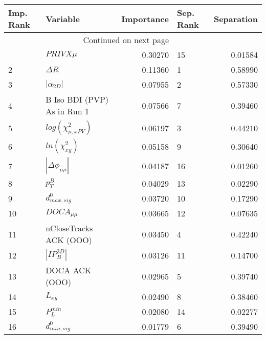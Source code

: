 \usepackage{lscape}

\begin{landscape}
\begin{longtable}{llrlr}
\toprule
Imp. Rank &                     Variable &  Importance & Sep. Rank &  Separation \\
\midrule
\endhead
\midrule
\multicolumn{3}{r}{{Continued on next page}} \\
\midrule
\endfoot

\bottomrule
\endlastfoot
        1 &                   $PRIVX\mu$ &     0.30270 &        15 &     0.01584 \\
        2 &                   $\Delta R$ &     0.11360 &         1 &     0.58990 \\
        3 &              $|\alpha_{2D}|$ &     0.07955 &         2 &     0.57330 \\
        4 &  B Iso BDI (PVP) As in Run 1 &     0.07566 &         7 &     0.39460 \\
        5 &    $log(\chi^{2}_{\mu,xPV})$ &     0.06197 &         3 &     0.44210 \\
        6 &          $ln(\chi^{2}_{xy})$ &     0.05158 &         9 &     0.30640 \\
        7 &     $|\Delta \phi_{\mu\mu}|$ &     0.04187 &        16 &     0.01260 \\
        8 &                    $p^B_{T}$ &     0.04029 &        13 &     0.02290 \\
        9 &             $d^0_{max, sig}$ &     0.03720 &        10 &     0.17290 \\
       10 &              $DOCA_{\mu\mu}$ &     0.03665 &        12 &     0.07635 \\
       11 &       nCloseTracks ACK (OOO) &     0.03450 &         4 &     0.42240 \\
       12 &              $|IP_{B}^{3D}|$ &     0.03126 &        11 &     0.14700 \\
       13 &               DOCA ACK (OOO) &     0.02965 &         5 &     0.39740 \\
       14 &                     $L_{xy}$ &     0.02490 &         8 &     0.38460 \\
       15 &                $P^{min}_{L}$ &     0.02080 &        14 &     0.02277 \\
       16 &             $d^0_{min, sig}$ &     0.01779 &         6 &     0.39490 \\
\end{longtable}

\end{landscape}
